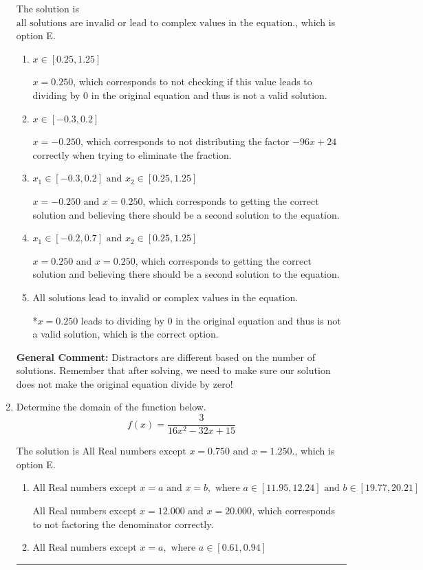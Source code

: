 \documentclass{extbook}[14pt]
\newcommand{\litem}[1]{\item #1

\rule{\textwidth}{0.4pt}}
\begin{document}
\begin{enumerate}
{The solution is \( \text{all solutions are invalid or lead to complex values in the equation.} \), which is option E.\begin{enumerate}[label=\Alph*.]
\item \( x \in [0.25,1.25] \)

$x = 0.250$, which corresponds to not checking if this value leads to dividing by 0 in the original equation and thus is not a valid solution.
\item \( x \in [-0.3,0.2] \)

$x = -0.250$, which corresponds to not distributing the factor $-96x + 24$ correctly when trying to eliminate the fraction.
\item \( x_1 \in [-0.3, 0.2] \text{ and } x_2 \in [0.25,1.25] \)

$x = -0.250 \text{ and } x = 0.250$, which corresponds to getting the correct solution and believing there should be a second solution to the equation.
\item \( x_1 \in [-0.2, 0.7] \text{ and } x_2 \in [0.25,1.25] \)

$x = 0.250 \text{ and } x = 0.250$, which corresponds to getting the correct solution and believing there should be a second solution to the equation.
\item \( \text{All solutions lead to invalid or complex values in the equation.} \)

*$x = 0.250$ leads to dividing by 0 in the original equation and thus is not a valid solution, which is the correct option.
\end{enumerate}

\textbf{General Comment:} Distractors are different based on the number of solutions. Remember that after solving, we need to make sure our solution does not make the original equation divide by zero!
}
\litem{
Determine the domain of the function below.
\[ f(x) = \frac{3}{16x^{2} -32 x + 15} \]

The solution is \( \text{All Real numbers except } x = 0.750 \text{ and } x = 1.250. \), which is option E.\begin{enumerate}[label=\Alph*.]
\item \( \text{All Real numbers except } x = a \text{ and } x = b, \text{ where } a \in [11.95, 12.24] \text{ and } b \in [19.77, 20.21] \)

All Real numbers except $x = 12.000$ and $x = 20.000$, which corresponds to not factoring the denominator correctly.
\item \( \text{All Real numbers except } x = a, \text{ where } a \in [0.61, 0.94] \)


\end{enumerate}}
\end{enumerate}
\end{document}
